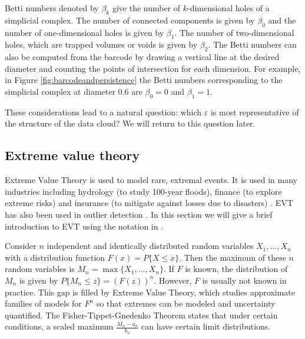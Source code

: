 \documentclass[12pt]{article}
\theoremstyle{definition}
\theoremstyle{definition}
\theoremstyle{definition}
\theoremstyle{remark}
\begin{document}
Betti numbers denoted by \(\beta_k\) give the number of \(k\)-dimensional holes of a simplicial complex. The number of connected components is given by \(\beta_0\) and the number of one-dimensional holes is given by \(\beta_1\). The number of two-dimensional holes, which are trapped volumes or voids is given by \(\beta_2\). The Betti numbers can also be computed from the barcode by drawing a vertical line at the desired diameter and counting the points of intersection for each dimension. For example, in Figure \ref{fig:barcodeandpersistence} the Betti numbers corresponding to the simplicial complex at diameter \(0.6\) are \(\beta_0 = 0\) and \(\beta_1 = 1\).

These considerations lead to a natural question: which \(\varepsilon\) is most representative of the structure of the data cloud? We will return to this question later.

\hypertarget{subsec:evt}{%
\subsection{Extreme value theory}\label{subsec:evt}}

Extreme Value Theory is used to model rare, extremal events. It is used in many industries including hydrology (to study 100-year floods), finance (to explore extreme risks) and insurance (to mitigate against losses due to disasters) \citep{Reiss2001}. EVT has also been used in outlier detection \citep{wilkinson2017visualizing, talagala2019anomaly}. In this section we will give a brief introduction to EVT using the notation in \citet{coles2001introduction}.

Consider \(n\) independent and identically distributed random variables \(X_1, \dots, X_n\) with a distribution function \(F(x) = P\{X \leq x\}\). Then the maximum of these \(n\) random variables is \(M_n = \max \{X_1, \dots, X_n\}\). If \(F\) is known, the distribution of \(M_n\) is given by \citep[p45]{coles2001introduction} \(P\{M_n \leq z \} = \left(F(z)\right)^n\). However, \(F\) is usually not known in practice. This gap is filled by Extreme Value Theory, which studies approximate families of models for \(F^n\) so that extremes can be modeled and uncertainty quantified. The Fisher-Tippet-Gnedenko Theorem states that under certain conditions, a scaled maximum \(\frac{M_n - a_n}{b_n}\) can have certain limit distributions.
\end{document}
